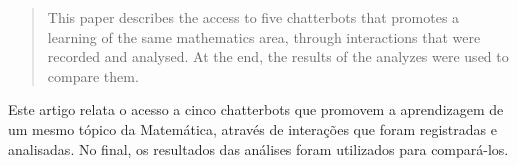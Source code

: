 \begin{abstract}
This paper describes the access to five chatterbots that promotes a
learning of the same mathematics area, through interactions that were recorded
and analysed. At the end, the results of the analyzes were used to compare them.
\end{abstract}

\begin{resumo} 
Este artigo relata o acesso a cinco chatterbots que promovem a aprendizagem
de um mesmo tópico da Matem\'atica, atrav\'es de interações que foram
registradas e analisadas. No final, os resultados das an\'alises foram utilizados
para compar\'a-los.
\end{resumo}

